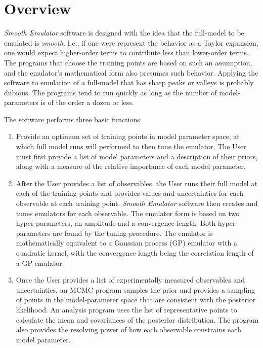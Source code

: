 \documentclass[12pt]{article}
\numberwithin{equation}{section}
\numberwithin{figure}{section}
\begin{document}
\newpage

\thispagestyle{empty}

\tableofcontents

\newpage

\thispagestyle{empty}

\section{Overview}\label{sec:overview}

{\it Smooth Emulator} software is designed with the idea that the full-model to be emulated is {\it smooth}. I.e., if one were represent the behavior as a Taylor expansion, one would expect higher-order terms to contribute less than lower-order terms. The programs that choose the training points are based on such an assumption, and the emulator's mathematical form also presumes such behavior. Applying the software to emulation of a full-model that has sharp peaks or valleys is probably dubious. The programs tend to run quickly as long as the number of model-parameters is of the order a dozen or less.

The software performs three basic functions.
\begin{enumerate}\itemsep=0pt
\item Provide an optimum set of training points in model parameter space, at which full model runs will performed to then tune the emulator. The User must first provide a list of model parameters and a description of their priors, along with a measure of the relative importance of each model parameter.
\item After the User provides a list of observables, the User runs their full model at each of the training points and provides values and uncertainties for each observable at each training point. {\it Smooth Emulator} software then creates and tunes emulators for each observable. The emulator form is based on two hyper-parameters, an amplitude and a convergence length. Both hyper-parameters are found by the tuning procedure. The emulator is mathematically equivalent to a Gaussian process (GP) emulator with a quadratic kernel, with the convergence length being the correlation length of a GP emulator.
\item Once the User provides a list of experimentally measured observables and uncertainties, an MCMC program samples the prior and provides a sampling of points in the model-parameter space that are consistent with the posterior likelihood. An analysis program uses the list of representative points to calculate the mean and covariances of the posterior distribution. The program also provides the resolving power of how each observable constrains each model parameter.
\end{enumerate}
\end{document}
